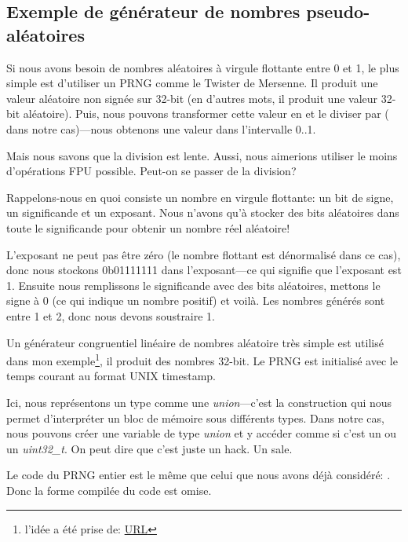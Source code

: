 \subsection{Exemple de générateur de nombres pseudo-aléatoires}
\label{FPU_PRNG}

Si nous avons besoin de nombres aléatoires à virgule flottante entre 0 et 1, le plus
simple est d'utiliser un \ac{PRNG} comme le Twister de Mersenne.
Il produit une valeur aléatoire non signée sur 32-bit (en d'autres mots, il produit
une valeur 32-bit aléatoire).
Puis, nous pouvons transformer cette valeur en \Tfloat et le diviser par 
( dans notre cas)---nous obtenons une valeur dans l'intervalle 0..1.

Mais nous savons que la division est lente.
Aussi, nous aimerions utiliser le moins d'opérations FPU possible.
Peut-on se passer de la division?


Rappelons-nous en quoi consiste un nombre en virgule flottante: un bit de signe,
un significande et un exposant.
Nous n'avons qu'à stocker des bits aléatoires dans toute le significande pour obtenir
un nombre réel aléatoire!

L'exposant ne peut pas être zéro (le nombre flottant est dénormalisé dans ce cas),
donc nous stockons 0b01111111 dans l'exposant---ce qui signifie que l'exposant est
1.
Ensuite nous remplissons le significande avec des bits aléatoires, mettons le signe à
0 (ce qui indique un nombre positif) et voilà.
Les nombres générés sont entre 1 et 2, donc nous devons soustraire 1.

\newcommand{\URLXOR}{\href{http://xor0110.wordpress.com/2010/09/24/how-to-generate-floating-point-random-numbers-efficiently/}{URL}}

Un générateur congruentiel linéaire de nombres aléatoire très simple est utilisé dans
mon exemple\footnote{l'idée a été prise de: \URLXOR}, il produit des nombres 32-bit.
Le \ac{PRNG} est initialisé avec le temps courant au format UNIX timestamp.

Ici, nous représentons un type \Tfloat comme une \emph{union}---c'est la construction \CCpp qui nous
permet d'interpréter un bloc de mémoire sous différents types.
Dans notre cas, nous pouvons créer une variable de type \emph{union} et y accéder comme
si c'est un \Tfloat ou un \emph{uint32\_t}.
On peut dire que c'est juste un hack. Un sale.


Le code du \ac{PRNG} entier est le même que celui que nous avons déjà considéré: .
Donc la forme compilée du code est omise.

